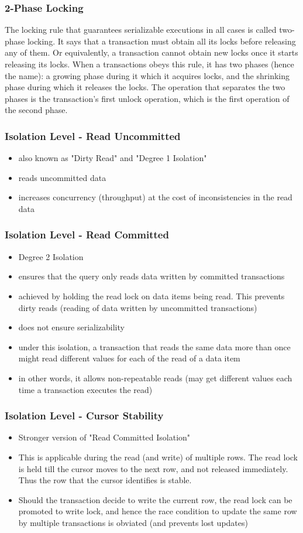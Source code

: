 \documentclass[12]{beamer}
\begin{document}
\begin{frame}
\frametitle{2-Phase Locking}
The locking rule that guarantees serializable executions in all cases is called two-phase locking. It says that a transaction must obtain all its locks before releasing any of them. Or equivalently, a transaction cannot obtain new locks once it starts releasing its locks. When a transactions obeys this rule, it has two phases (hence the name): a growing phase during it which it acquires locks, and the shrinking phase during which it releases the locks. The operation that separates the two phases is the transaction's first unlock operation, which is the first operation of the second phase.
\end{frame}

\begin{frame}
\frametitle{Isolation Level - Read Uncommitted}
\begin{itemize}
\item also known as "Dirty Read" and "Degree 1 Isolation"
\item reads uncommitted data
\item increases concurrency (throughput) at the cost of inconsistencies in the read data
\end{itemize}
\end{frame}

\begin{frame}
\frametitle{Isolation Level - Read Committed}
\begin{itemize}
\item Degree 2 Isolation
\item ensures that the query only reads data written by committed transactions
\item achieved by holding the read lock on data items being read. This prevents dirty reads (reading of data written by uncommitted transactions)
\item does not ensure serializability
\item under this isolation, a transaction that reads the same data more than once might read different values for each of the read of a data item
\item in other words, it allows non-repeatable reads (may get different values each time a transaction executes the read)
\end{itemize}
\end{frame}

\begin{frame}
\frametitle{Isolation Level - Cursor Stability}
\begin{itemize}
\item Stronger version of "Read Committed Isolation"
\item This is applicable during the read (and write) of multiple rows. The read lock is held till the cursor moves to the next row, and not released immediately. Thus the row that the cursor identifies is stable.
\item Should the transaction decide to write the current row, the read lock can be promoted to write lock, and hence the race condition to update the same row by multiple transactions is obviated (and prevents lost updates)
\end{itemize}
\end{frame}
\end{document}
